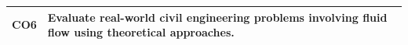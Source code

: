 \documentclass[12pt, a4paper]{article}
\begin{document}
\begin{center}
\begin{tabularx}{\textwidth}{|c|X|}
                                                                                                                                                                                                                                                                                                                                                                                                                                                                                                                                                                                                                                                                                                                                                    \hline
                                                                                                                                                                                                                                                                                                                                                                                                                                                                                                                                                                                                                                                                                                                                                            CO6 & Evaluate real-world civil engineering problems involving fluid flow using theoretical approaches. \\
                                                                                                                                                                                                                                                                                                                                                                                                                                                                                                                                                                                                                                                                                                                                                                    \hline
                                                                                                                                                                                                                                                                                                                                                                                                                                                                                                                                                                                                                                                                                                                                                                        \end{tabularx}

\end{center}
\end{document}
